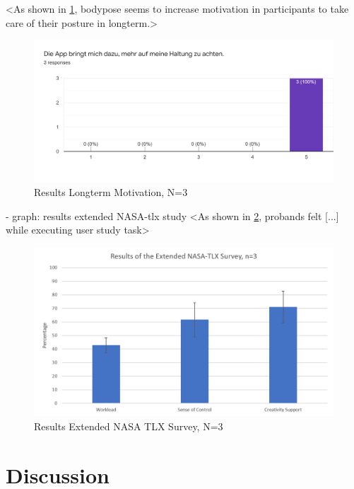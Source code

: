 <As shown in \ref{fig:us-gs-longterm}, bodypose seems to increase motivation in participants to take care of their posture in longterm.>

\begin{figure}[hbp]
\centering
\includegraphics[width=\linewidth]{media/us-gs-longterm-motivation-results.png}    
\caption{Results Longterm Motivation, N=3}
\label{fig:us-gs-longterm}
\end{figure}


- graph: results extended NASA-tlx study
<As shown in \ref{fig:ext-nasa-results}, probands felt [...] while executing user study task>

\begin{figure}[hbp]
\centering
\includegraphics[width=\linewidth]{media/us-ext-nasa-tlx-results.png}    
\caption{Results Extended NASA TLX Survey, N=3}
    \label{fig:ext-nasa-results}
\end{figure}

\section{Discussion} %
\label{discussion-future-work}


